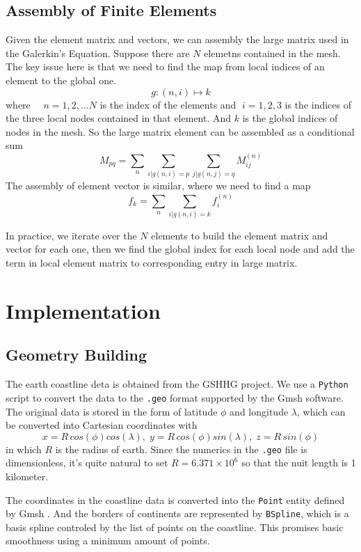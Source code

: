 \documentclass[a4paper]{article}
\begin{document}
\subsection{Assembly of Finite Elements}
Given the element matrix and vectors, we can assembly the large matrix used in the Galerkin's Equation.
Suppose there are $N$ elemetns contained in the mesh.
The key issue here is that we need to find the map from local indices of an element to the global one.
\[
g:(n,i)\mapsto k 
\]
where $\quad n=1,2,\dots N$ is the index of the elements and $\; i=1,2,3$ is the indices of 
the three local nodes contained in that element. And $k$ is the global indices of nodes in the mesh.
So the large matrix element can be assembled as a conditional sum
\[
M_{pq}=\sum_{n} \sum_{i|g(n,i)=p} \sum_{j|g(n,j)=q}  M^{(n)}_{ij}
\]
The assembly of element vector is similar, where we need to find a map
\[
f_k=\sum_{n} \sum_{i|g(n,i)=k} f^{(n)}_i
\]

In practice, we iterate over the $N$ elements to build the element matrix and vector for each one, 
then we find the global index for each local node and add the term in local element matrix to corresponding entry in large matrix.


\section{Implementation}
\subsection{Geometry Building}
The earth coastline deta is obtained from the GSHHG project\cite{wessel1996global}.
We use a \verb|Python| script to convert the data to the \verb|.geo| format supported by the
Gmsh software.
The original data is stored in the form of latitude $\phi$ and longitude $\lambda$, which can be converted into 
Cartesian coordinates with 
\[
    x = R\, cos(\phi)cos(\lambda), \; y =  R\, cos(\phi)sin(\lambda), \; z = R\, sin(\phi)
\]
in which $R$ is the radius of earth. Since the numerics in the \verb|.geo| file is dimensionless, 
it's quite natural to set $R=6.371\times 10^6$ so that the nuit length is 1 kilometer.

The coordinates in the coastline data is converted into the \verb|Point| entity defined by Gmsh .
And the borders of continents are represented by \verb|BSpline|, which is a basis spline controled by 
the list of points on the coastline. This promises basic smoothness using a minimum amount of points.
\end{document}

